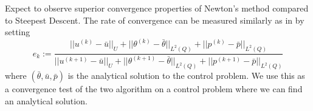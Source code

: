 Expect to observe superior convergence properties of Newton's method compared to Steepest Descent. The rate of convergence can be measured similarly as in \cite{DPSteel} by setting 
\begin{equation}
    \label{eq:rate_of_conv}
    e_k := \frac{||u^{(k)}-\bar{u}||_U + ||\theta^{(k)}-\bar{\theta}||_{L^2(Q)} +||p^{(k)}-\bar{p}||_{L^2(Q)} }{||u^{(k+1)}-\bar{u}||_U + ||\theta^{(k+1)}-\bar{\theta}||_{L^2(Q)} +||p^{(k+1)}-\bar{p}||_{L^2(Q)}}
\end{equation}
where $(\bar{\theta},\bar{u},\bar{p})$ is the analytical solution to the control problem. We use this as a convergence test of the two algorithm on a control problem where we can find an analytical solution. 


